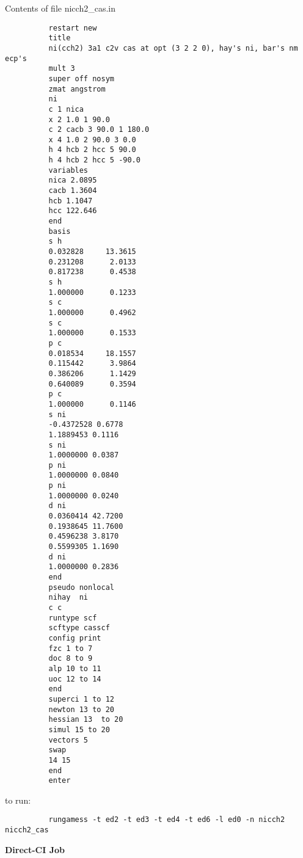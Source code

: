 \documentclass[11pt,fleqn]{article}
\begin{document}
Contents of file nicch2\_cas.in
{
\footnotesize
\begin{verbatim}
          restart new
          title
          ni(cch2) 3a1 c2v cas at opt (3 2 2 0), hay's ni, bar's nm ecp's
          mult 3
          super off nosym
          zmat angstrom
          ni
          c 1 nica
          x 2 1.0 1 90.0
          c 2 cacb 3 90.0 1 180.0
          x 4 1.0 2 90.0 3 0.0
          h 4 hcb 2 hcc 5 90.0
          h 4 hcb 2 hcc 5 -90.0
          variables
          nica 2.0895
          cacb 1.3604
          hcb 1.1047
          hcc 122.646
          end
          basis
          s h
          0.032828     13.3615
          0.231208      2.0133
          0.817238      0.4538
          s h
          1.000000      0.1233
          s c
          1.000000      0.4962
          s c
          1.000000      0.1533
          p c
          0.018534     18.1557
          0.115442      3.9864
          0.386206      1.1429
          0.640089      0.3594
          p c
          1.000000      0.1146
          s ni
          -0.4372528 0.6778
          1.1889453 0.1116
          s ni
          1.0000000 0.0387
          p ni
          1.0000000 0.0840
          p ni
          1.0000000 0.0240
          d ni
          0.0360414 42.7200
          0.1938645 11.7600
          0.4596238 3.8170
          0.5599305 1.1690
          d ni
          1.0000000 0.2836
          end
          pseudo nonlocal
          nihay  ni
          c c
          runtype scf
          scftype casscf
          config print
          fzc 1 to 7
          doc 8 to 9
          alp 10 to 11
          uoc 12 to 14
          end
          superci 1 to 12
          newton 13 to 20
          hessian 13  to 20
          simul 15 to 20
          vectors 5
          swap
          14 15
          end
          enter
\end{verbatim}
}
to run:
{
\footnotesize
\begin{verbatim}
          rungamess -t ed2 -t ed3 -t ed4 -t ed6 -l ed0 -n nicch2 nicch2_cas
\end{verbatim}
}
{\bf Direct-CI Job}\\
\end{document}
